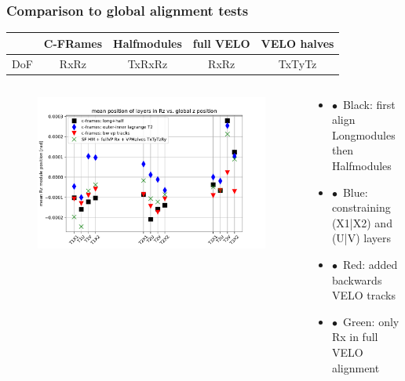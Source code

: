 \documentclass[aspectratio=1610, 12pt, xcolor=dvipsnames]{beamer}
\begin{document}
\begin{frame}\frametitle{Comparison to global alignment tests}
  \begin{table}
    \begin{tabular}{c | c c c c}
      \toprule
         & C-FRames & Halfmodules & full VELO & VELO halves \\
      \midrule
        DoF & RxRz & TxRxRz & RxRz & TxTyTz \\
      \bottomrule
    \end{tabular}
  \end{table}
  \begin{columns}
    \begin{column}[c]{0.48\textwidth}
      \begin{figure}
        \centering
        \includegraphics[width=\textwidth]{plots/outfiles_vs_global/all_runs_fix_glob_z_vs_local_Rz.pdf}
      \end{figure}
    \end{column}
    \begin{column}[c]{0.48\textwidth}
      \begin{itemize}
        \item $\bullet$\, Black: first align Longmodules then Halfmodules
        \item $\bullet$\, \color{blue}Blue\color{black}: constraining (X1|X2) and (U|V) layers
        \item $\bullet$\, \color{red}Red\color{black}: added backwards VELO tracks
        \item $\bullet$\, \color{green}Green\color{black}: only Rx in full VELO alignment
      \end{itemize}
    \end{column}
  \end{columns}
\end{frame}
\end{document}
